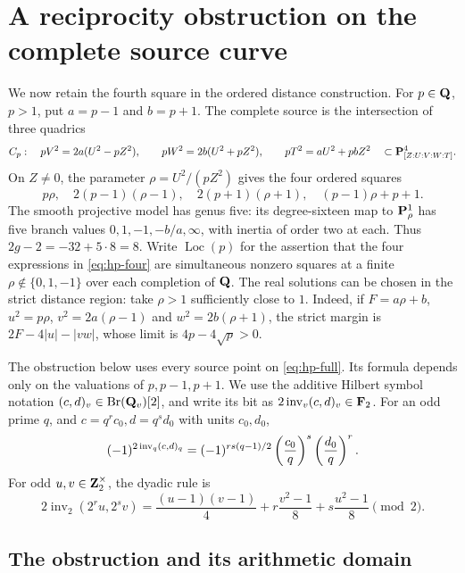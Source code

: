 \section{A reciprocity obstruction on the complete source curve}
\label{sec:hasse-families}

We now retain the fourth square in the ordered distance construction.
For $p\in\mathbf Q$, $p>1$, put $a=p-1$ and $b=p+1$.  The complete source
is the intersection of three quadrics
\begin{equation}\label{eq:hp-full}
 C_p:\quad pV^2=2a(U^2-pZ^2),\qquad
 pW^2=2b(U^2+pZ^2),\qquad pT^2=aU^2+pbZ^2
 \quad\subset\mathbf P^4_{[Z:U:V:W:T]}.
\end{equation}
On $Z\ne0$, the parameter $\rho=U^2/(pZ^2)$ gives the four ordered
squares
\begin{equation}\label{eq:hp-four}
 p\rho,\quad 2(p-1)(\rho-1),\quad
 2(p+1)(\rho+1),\quad (p-1)\rho+p+1.
\end{equation}
The smooth projective model has genus five: its degree-sixteen map to
$\mathbf P^1_\rho$ has five branch values
$0,1,-1,-b/a,\infty$, with inertia of order two at each.
Thus $2g-2=-32+5\cdot8=8$.
Write $\operatorname{Loc}(p)$ for the assertion that the four expressions
in \eqref{eq:hp-four} are simultaneous nonzero squares at a finite
$\rho\notin\{0,1,-1\}$ over each completion of $\mathbf Q$.
The real solutions can be chosen in the strict distance region: take
$\rho>1$ sufficiently close to $1$.  Indeed, if
$F=a\rho+b$, $u^2=p\rho$, $v^2=2a(\rho-1)$ and
$w^2=2b(\rho+1)$, the strict margin is
$2F-4|u|-|vw|$, whose limit is $4p-4\sqrt p>0$.

The obstruction below uses every source point on \eqref{eq:hp-full}.
Its formula depends only on the valuations of $p,p-1,p+1$.
We use the additive Hilbert symbol notation $(c,d)_v\in\operatorname{Br}(\mathbf Q_v)[2]$,
and write its bit as $2\operatorname{inv}_v(c,d)_v\in\mathbf F_2$.
For an odd prime $q$, and $c=q^r c_0,d=q^s d_0$ with units $c_0,d_0$,
\begin{equation}\label{eq:hp-hilbert}
 (-1)^{2\operatorname{inv}_q(c,d)_q}
 =(-1)^{rs(q-1)/2}\left(\frac{c_0}{q}\right)^{s}\left(\frac{d_0}{q}\right)^{r}.
\end{equation}
For odd $u,v\in\mathbf Z_2^\times$, the dyadic rule is
\begin{equation}\label{eq:hp-hilbert2}
 2\operatorname{inv}_2(2^r u,2^s v)
 =\frac{(u-1)(v-1)}4+r\frac{v^2-1}8+s\frac{u^2-1}8\pmod2.
\end{equation}

\subsection{The obstruction and its arithmetic domain}

